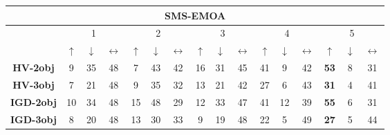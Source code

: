 \begin{table}[t]
\begin{scriptsize}
\begin{tabular}{|c|c|c|c|c|c|c|c|c|c|c|c|c|c|c|c|}
\hline
\hline
\multicolumn{16}{|c|}{SMS-EMOA} \\ \hline
 & \multicolumn{3}{c|}{1} & \multicolumn{3}{c|}{2} & \multicolumn{3}{c|}{3} & \multicolumn{3}{c|}{4} & \multicolumn{3}{c|}{5} \\ \hline
 & $\uparrow$ & $\downarrow$ & $\longleftrightarrow$ & $\uparrow$ & $\downarrow$ & $\longleftrightarrow$ & $\uparrow$ & $\downarrow$ & $\longleftrightarrow$ & $\uparrow$ & $\downarrow$ & $\longleftrightarrow$ & $\uparrow$ & $\downarrow$ & $\longleftrightarrow$ \\ \hline
\textbf{HV-2obj} & 9 & 35 & 48 & 7 & 43 & 42 & 16 & 31 & 45 & 41 & 9 & 42 & \textbf{53} & 8 & 31 \\ \hline
\textbf{HV-3obj} & 7 & 21 & 48 & 9 & 35 & 32 & 13 & 21 & 42 & 27 & 6 & 43 & \textbf{31} & 4 & 41 \\ \hline
\textbf{IGD-2obj} & 10 & 34 & 48 & 15 & 48 & 29 & 12 & 33 & 47 & 41 & 12 & 39 & \textbf{55} & 6 & 31 \\ \hline
\textbf{IGD-3obj} & 8 & 20 & 48 & 13 & 30 & 33 & 9 & 19 & 48 & 22 & 5 & 49 & \textbf{27} & 5 & 44 \\ \hline
\end{tabular}
\end{scriptsize}
\end{table}

